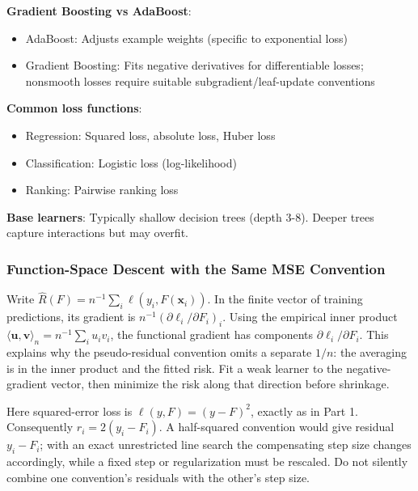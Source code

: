 \documentclass[11pt,twoside]{article}
\numberwithin{equation}{section}
\newcommand{\vect}[1]{\bm{#1}}
\theoremstyle{plain}
\theoremstyle{definition}
\theoremstyle{remark}
\newenvironment{keyidea}{
  \begin{tcolorbox}[colback=yellow!5!white,
                    colframe=yellow!50!black,
                    title=Key Idea,
                    breakable,
                    enhanced,
                    sharp corners,
                    boxrule=0.8pt,
                    left=6pt, right=6pt, top=6pt, bottom=6pt]
}{
  \end{tcolorbox}
}
\begin{document}
\begin{keyidea}
\textbf{Gradient Boosting vs AdaBoost}:
\begin{itemize}
\item AdaBoost: Adjusts example weights (specific to exponential loss)
\item Gradient Boosting: Fits negative derivatives for differentiable losses; nonsmooth losses require suitable subgradient/leaf-update conventions
\end{itemize}

\textbf{Common loss functions}:
\begin{itemize}
\item Regression: Squared loss, absolute loss, Huber loss
\item Classification: Logistic loss (log-likelihood)
\item Ranking: Pairwise ranking loss
\end{itemize}

\textbf{Base learners}: Typically shallow decision trees (depth 3-8). Deeper trees capture interactions but may overfit.
\end{keyidea}

\subsubsection{Function-Space Descent with the Same MSE Convention}
\label{sec:gbm-scaling}
Write $\widehat R(F)=n^{-1}\sum_i\ell(y_i,F(\vect x_i))$. In the finite vector of training predictions, its gradient is $n^{-1}(\partial\ell_i/\partial F_i)_i$. Using the empirical inner product $\langle\vect u,\vect v\rangle_n=n^{-1}\sum_i u_iv_i$, the functional gradient has components $\partial\ell_i/\partial F_i$. This explains why the pseudo-residual convention omits a separate $1/n$: the averaging is in the inner product and the fitted risk. Fit a weak learner to the negative-gradient vector, then minimize the risk along that direction before shrinkage.

Here squared-error loss is $\ell(y,F)=(y-F)^2$, exactly as in Part 1. Consequently $r_i=2(y_i-F_i)$. A half-squared convention would give residual $y_i-F_i$; with an exact unrestricted line search the compensating step size changes accordingly, while a fixed step or regularization must be rescaled. Do not silently combine one convention's residuals with the other's step size.
\end{document}
